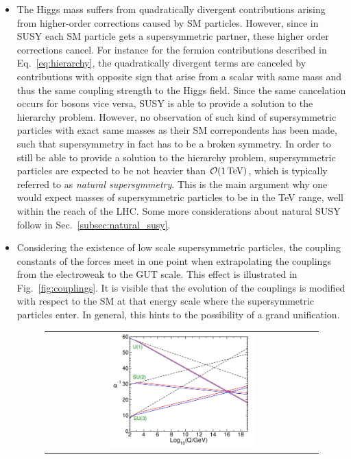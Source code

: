 \begin{itemize}
 \item The Higgs mass suffers from quadratically divergent contributions arising from higher-order corrections caused by SM particles. However, since in SUSY each SM particle gets a supersymmetric partner, these higher order corrections cancel. For instance for the fermion contributions described in Eq.~\ref{eq:hierarchy}, the quadratically divergent terms are canceled by contributions with opposite sign that arise from a scalar with same mass and thus the same coupling strength to the Higgs field. Since the same cancelation occurs for bosons vice versa, SUSY is able to provide a solution to the hierarchy problem. However, no observation of such kind of supersymmetric particles with exact same masses as their SM correpondents has been made, such that supersymmetry in fact has to be a broken symmetry. In order to still be able to provide a solution to the hierarchy problem, supersymmetric particles are expected to be not heavier than $\mathcal{O}(\mathrm{1\,\text{Te}\kern-0.06667em\text{V}})$, which is typically referred to as \textit{natural supersymmetry}. This is the main argument why one would expect masses of supersymmetric particles to be in the TeV range, well within the reach of the LHC. Some more considerations about natural SUSY follow in Sec.~\ref{subsec:natural_susy}.
 \item Considering the existence of low scale supersymmetric particles, the coupling constants of the forces meet in one point when extrapolating the couplings from the electroweak to the GUT scale. This effect is illustrated in Fig.~\ref{fig:couplings}. It is visible that the evolution of the couplings is modified with respect to the SM at that energy scale where the supersymmetric particles enter. In general, this hints to the possibility of a grand unification.
\begin{figure}[!t]
  \centering
  \begin{tabular}{c}
    \includegraphics[width=0.55\textwidth]{figures/Couplings.jpg}

\end{tabular}
\end{figure}
\end{itemize}
